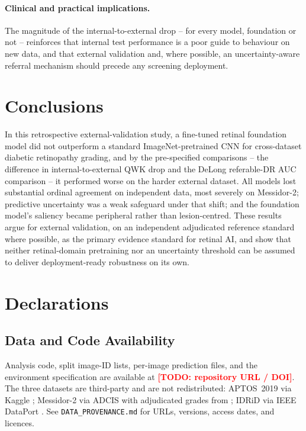 \documentclass[11pt,a4paper]{article}
\newcommand{\todo}[1]{\textcolor{red}{\textbf{[TODO: #1]}}}
\begin{document}
\paragraph{Clinical and practical implications.} The magnitude of the
internal-to-external drop -- for every model, foundation or not -- reinforces
that internal test performance is a poor guide to behaviour on new data, and
that external validation and, where possible, an uncertainty-aware referral
mechanism should precede any screening deployment.

\section{Conclusions}

In this retrospective external-validation study, a fine-tuned retinal foundation
model did not outperform a standard ImageNet-pretrained CNN for cross-dataset
diabetic retinopathy grading, and by the pre-specified comparisons -- the
difference in internal-to-external QWK drop and the DeLong referable-DR AUC
comparison -- it performed worse on the harder external dataset. All models
lost substantial ordinal agreement on independent data, most severely on
Messidor-2; predictive uncertainty was a weak safeguard under that shift; and the
foundation model's saliency became peripheral rather than lesion-centred. These
results argue for external validation, on an independent adjudicated reference
standard where possible, as the primary evidence standard for retinal AI, and
show that neither retinal-domain pretraining nor an uncertainty threshold can be
assumed to deliver deployment-ready robustness on its own.

\section*{Declarations}

\subsection*{Data and Code Availability}
\label{sec:availability}
Analysis code, split image-ID lists, per-image prediction files, and the
environment specification are available at \todo{repository URL / DOI}. The three
datasets are third-party and are not redistributed: APTOS~2019 via Kaggle
\citep{aptos2019}; Messidor-2 via ADCIS \citep{decenciere2014} with adjudicated
grades from \citep{krause2018}; IDRiD via IEEE DataPort \citep{porwal2018}. See
\texttt{DATA\_PROVENANCE.md} for URLs, versions, access dates, and licences.
\end{document}
